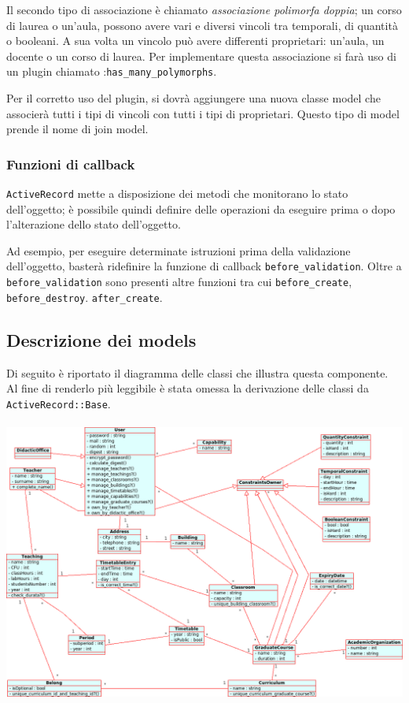 \documentclass[11pt,a4paper]{article}
\begin{document}
Il secondo tipo di associazione è chiamato \textit{associazione polimorfa doppia}; un corso di laurea o un'aula, possono avere vari e diversi vincoli tra temporali, di quantità o booleani. A sua volta un vincolo può avere differenti proprietari: un'aula, un docente o un corso di laurea.
Per implementare questa associazione si farà uso di un plugin chiamato :\verb|has_many_polymorphs|.

Per il corretto uso del plugin, si dovrà aggiungere una nuova classe model che associerà tutti i tipi di vincoli con tutti i tipi di proprietari. Questo tipo di model prende il nome di join model.
\subsubsection*{Funzioni di callback}
\verb|ActiveRecord| mette a disposizione dei metodi che monitorano lo stato dell'oggetto; è possibile quindi definire delle operazioni da eseguire prima o dopo l'alterazione dello stato dell'oggetto.

Ad esempio, per eseguire determinate istruzioni prima della validazione dell'oggetto, basterà ridefinire la funzione di callback \verb|before_validation|.
Oltre a \verb|before_validation| sono presenti altre funzioni tra cui \verb|before_create|, \verb|before_destroy|. \verb|after_create|.
\newpage
\subsection{Descrizione dei models}
Di seguito è riportato il diagramma delle classi che illustra questa componente. Al fine di renderlo più leggibile è stata omessa la derivazione delle classi da \verb|ActiveRecord::Base|. \\
\bigskip \\
\includegraphics[scale=0.30]{images/Model_ClassDiagram.png}
\end{document}
